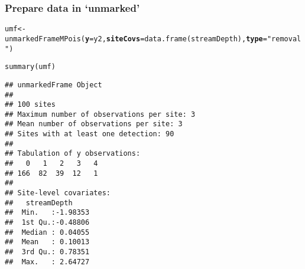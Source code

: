 \documentclass[color=usenames,dvipsnames]{beamer}\usepackage[]{graphicx}\usepackage[]{color}
\makeatletter
\newcommand{\hlstr}[1]{\textcolor[rgb]{0.749,0.012,0.012}{#1}}%
\newcommand{\hlstd}[1]{\textcolor[rgb]{0,0,0}{#1}}%
\newcommand{\hlkwb}[1]{\textcolor[rgb]{0,0.341,0.682}{#1}}%
\newcommand{\hlkwc}[1]{\textcolor[rgb]{0,0,0}{\textbf{#1}}}%
\newcommand{\hlkwd}[1]{\textcolor[rgb]{0.004,0.004,0.506}{#1}}%
\newenvironment{kframe}{%
 \def\at@end@of@kframe{}%
 \ifinner\ifhmode%
  \def\at@end@of@kframe{\end{minipage}}%
  \begin{minipage}{\columnwidth}%
 \fi\fi%
 \def\FrameCommand##1{\hskip\@totalleftmargin \hskip-\fboxsep
 \colorbox{shadecolor}{##1}\hskip-\fboxsep
     \hskip-\linewidth \hskip-\@totalleftmargin \hskip\columnwidth}%
 \MakeFramed {\advance\hsize-\width
   \@totalleftmargin\z@ \linewidth\hsize
   \@setminipage}}%
 {\par\unskip\endMakeFramed%
 \at@end@of@kframe}
\newenvironment{knitrout}{}{} %
\makeatother
\begin{document}
\begin{frame}[fragile]
\begin{columns}
\begin{column}{0.6\textwidth}
  \end{column}
  \end{columns}
\end{frame}


















\begin{frame}[fragile]
  \frametitle{Prepare data in `unmarked'}
  \small
\begin{knitrout}\tiny
{}\color{fgcolor}\begin{kframe}
\begin{alltt}
\hlstd{umf} \hlkwb{<-} \hlkwd{unmarkedFrameMPois}\hlstd{(}\hlkwc{y}\hlstd{=y2,} \hlkwc{siteCovs}\hlstd{=}\hlkwd{data.frame}\hlstd{(streamDepth),} \hlkwc{type}\hlstd{=}\hlstr{"removal"}\hlstd{)}
\end{alltt}
\end{kframe}
\end{knitrout}
\pause
\begin{knitrout}\scriptsize
{}\color{fgcolor}\begin{kframe}
\begin{alltt}
\hlkwd{summary}\hlstd{(umf)}
\end{alltt}
\begin{verbatim}
## unmarkedFrame Object
## 
## 100 sites
## Maximum number of observations per site: 3 
## Mean number of observations per site: 3 
## Sites with at least one detection: 90 
## 
## Tabulation of y observations:
##   0   1   2   3   4 
## 166  82  39  12   1 
## 
## Site-level covariates:
##   streamDepth      
##  Min.   :-1.98353  
##  1st Qu.:-0.48806  
##  Median : 0.04055  
##  Mean   : 0.10013  
##  3rd Qu.: 0.78351  
##  Max.   : 2.64727
\end{verbatim}
\end{kframe}
\end{knitrout}
\end{frame}
\end{document}
